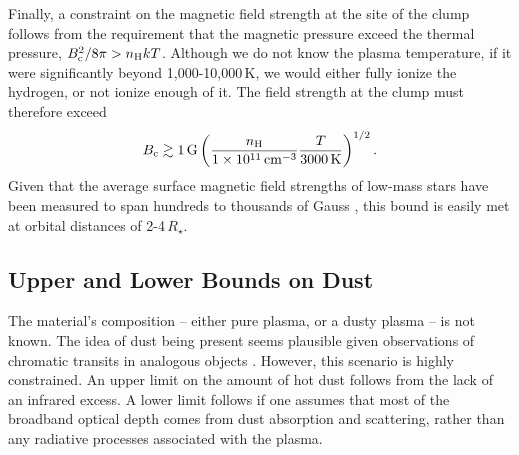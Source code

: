 \documentclass{nature3}
\begin{document}
\begin{methods}
Finally, a constraint on the magnetic field strength at the site of
the clump follows from the requirement that the magnetic pressure
exceed the thermal pressure, $B_{\rm c}^2 / 8\pi > n_{\rm H} k T$.
Although we do not know the plasma temperature, if it were
significantly beyond 1,000-10,000\,K, we would either fully ionize the
hydrogen, or not ionize enough of it.  The field strength at the clump
must therefore exceed
\begin{equation}
  B_{\rm c} \gtrsim 1\,{\rm G}
  \left(
  \frac{n_{\rm H}}{1\times10^{11}\,{\rm cm}^{-3}}
  \frac{T}{3000\,{\rm K}}
  \right)^{1/2}.
\end{equation}
Given that the average surface magnetic field strengths of low-mass
stars have been measured to span hundreds to thousands of Gauss
\cite{Donati2009,Kochukhov2021,Reiners2022}, this bound is easily met
at orbital distances of 2-4\,$R_\star$.

\subsection{Upper and Lower Bounds on Dust}\phantom{+}
\label{subsec:dust}

The material's composition -- either pure plasma, or a dusty plasma --
is not known.  The idea of dust being present seems plausible given
observations of chromatic transits in analogous objects
\cite{Tanimoto2020,Gunther2022,Koen2023}.  However, this scenario is
highly constrained.  An upper limit on the amount of hot dust follows
from the lack of an infrared excess.  A lower limit follows if one
assumes that most of the broadband optical depth comes from dust
absorption and scattering, rather than any radiative processes
associated with the plasma.


\end{methods}
\end{document}
